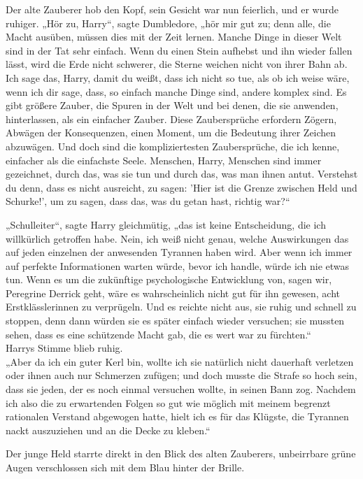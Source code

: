 {Der alte Zauberer hob den Kopf, sein Gesicht war nun feierlich, und er wurde ruhiger. „Hör zu, Harry“, sagte Dumbledore, „hör mir gut zu; denn alle, die Macht ausüben, müssen dies mit der Zeit lernen. Manche Dinge in dieser Welt sind in der Tat sehr einfach. Wenn du einen Stein aufhebst und ihn wieder fallen lässt, wird die Erde nicht schwerer, die Sterne weichen nicht von ihrer Bahn ab. Ich sage das, Harry, damit du weißt, dass ich nicht so tue, als ob ich weise wäre, wenn ich dir sage, dass, so einfach manche Dinge sind, andere komplex sind. Es gibt größere Zauber, die Spuren in der Welt und bei denen, die sie anwenden, hinterlassen, als ein einfacher Zauber. Diese Zaubersprüche erfordern Zögern, Abwägen der Konsequenzen, einen Moment, um die Bedeutung ihrer Zeichen abzuwägen. Und doch sind die kompliziertesten Zaubersprüche, die ich kenne, einfacher als die einfachste Seele. Menschen, Harry, Menschen sind immer gezeichnet, durch das, was sie tun und durch das, was man ihnen antut. Verstehst du denn, dass es nicht ausreicht, zu sagen: 'Hier ist die Grenze zwischen Held und Schurke!', um zu sagen, dass das, was du getan hast, richtig war?“

„Schulleiter“, sagte Harry gleichmütig, „das ist keine Entscheidung, die ich willkürlich getroffen habe. Nein, ich weiß nicht genau, welche Auswirkungen das auf jeden einzelnen der anwesenden Tyrannen haben wird. Aber wenn ich immer auf perfekte Informationen warten würde, bevor ich handle, würde ich nie etwas tun. Wenn es um die zukünftige psychologische Entwicklung von, sagen wir, Peregrine Derrick geht, wäre es wahrscheinlich nicht gut für ihn gewesen, acht Erstklässlerinnen zu verprügeln. Und es reichte nicht aus, sie ruhig und schnell zu stoppen, denn dann würden sie es später einfach wieder versuchen; sie mussten sehen, dass es eine schützende Macht gab, die es wert war zu fürchten.“\\ Harrys Stimme blieb ruhig.\\ „Aber da ich ein guter Kerl bin, wollte ich sie natürlich nicht dauerhaft verletzen oder ihnen auch nur Schmerzen zufügen; und doch musste die Strafe so hoch sein, dass sie jeden, der es noch einmal versuchen wollte, in seinen Bann zog. Nachdem ich also die zu erwartenden Folgen so gut wie möglich mit meinem begrenzt rationalen Verstand abgewogen hatte, hielt ich es für das Klügste, die Tyrannen nackt auszuziehen und an die Decke zu kleben.“

Der junge Held starrte direkt in den Blick des alten Zauberers, unbeirrbare grüne Augen verschlossen sich mit dem Blau hinter der Brille.

}
